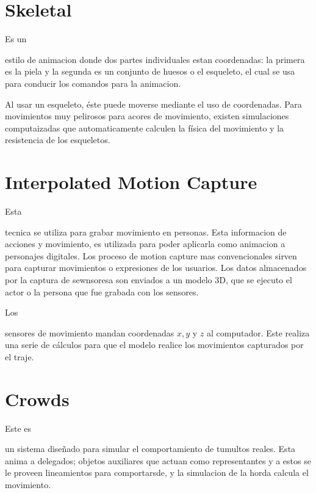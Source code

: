 \documentclass[stu, 12pt, letterpaper, donotrepeattitle, floatsintext, natbib]{apa7}
\begin{document}
    \section{Skeletal}
    Es un \begin{justifying}
      estilo de animacion donde dos partes individuales estan coordenadas: la primera es la piela y la segunda es un conjunto de huesos o el esqueleto, el cual se
      usa para conducir los comandos para la animacion.\par \citep{techopedia-2015}%
    \end{justifying}
    Al usar un esqueleto, éste puede moverse mediante el uso de coordenadas. Para movimientos muy pelirosos para acores de movimiento, existen simulaciones computaizadas que
    automaticamente calculen la física del movimiento y la resistencia de los esqueletos.\par
    \vspace{\baselineskip}
    \section{Interpolated Motion Capture}
    Esta \begin{justifying}
      tecnica se utiliza para grabar movimiento en personas. Esta informacion de acciones y movimiento, es utilizada para poder aplicarla como animacion a personajes digitales.
      Los proceso de motion capture mas convencionales sirven para capturar movimientos o expresiones de los usuarios. Los datos almacenados por la captura de sewnsoresa son enviados
      a un modelo 3D, que se ejecuto el actor o la persona que fue grabada con los sensores. \citep{unknown-author-1963}\par %
    \end{justifying}
    Los \begin{justifying}
      sensores de movimiento mandan coordenadas \(x, y\) y \(z\) al computador. Este realiza una serie de cálculos para que el modelo realice los movimientos capturados por el traje.\par
    \end{justifying}
    \vspace{\baselineskip}
    \section{Crowds}
    Este es \begin{justifying}
      un sistema diseñado para simular el comportamiento de tumultos reales. Esta anima a delegados; objetos auxiliares que actuan como representantes
      y a estos se le proveen lineamientos para comportarsde, y la simulacion de la horda calcula el movimiento. \citep{autodesk-2018}\par %
    \end{justifying}
    \vspace{\baselineskip}
    
    \newpage   
    \renewcommand\refname{\textbf{Referencias}}
    
    
\end{document}
